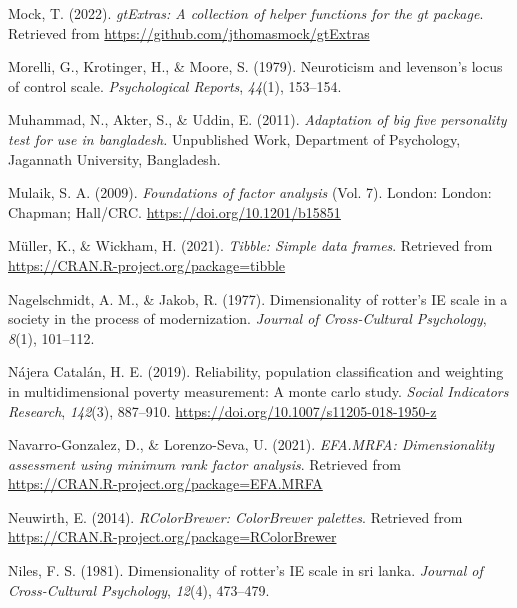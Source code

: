 \documentclass[
  english,
  man]{apa6}
\newlength{\cslhangindent}
\newlength{\cslentryspacingunit} %
\newenvironment{CSLReferences}[2] %
 {%
  \setlength{\parindent}{0pt}
  \ifodd #1
  \let\oldpar\par
  \def\par{\hangindent=\cslhangindent\oldpar}
  \fi
  \setlength{\parskip}{#2\cslentryspacingunit}
 }%
 {}
\begin{document}
\begin{CSLReferences}{1}{0}
\leavevmode{}%
Mock, T. (2022). \emph{gtExtras: A collection of helper functions for the gt package}. Retrieved from \url{https://github.com/jthomasmock/gtExtras}

\leavevmode{}%
Morelli, G., Krotinger, H., \& Moore, S. (1979). Neuroticism and levenson's locus of control scale. \emph{Psychological Reports}, \emph{44}(1), 153--154.

\leavevmode{}%
Muhammad, N., Akter, S., \& Uddin, E. (2011). \emph{Adaptation of big five personality test for use in bangladesh.} Unpublished Work, Department of Psychology, Jagannath University, Bangladesh.

\leavevmode{}%
Mulaik, S. A. (2009). \emph{Foundations of factor analysis} (Vol. 7). London: London: Chapman; Hall/CRC. \url{https://doi.org/10.1201/b15851}

\leavevmode{}%
Müller, K., \& Wickham, H. (2021). \emph{Tibble: Simple data frames}. Retrieved from \url{https://CRAN.R-project.org/package=tibble}

\leavevmode{}%
Nagelschmidt, A. M., \& Jakob, R. (1977). Dimensionality of rotter's IE scale in a society in the process of modernization. \emph{Journal of Cross-Cultural Psychology}, \emph{8}(1), 101--112.

\leavevmode{}%
Nájera Catalán, H. E. (2019). Reliability, population classification and weighting in multidimensional poverty measurement: A monte carlo study. \emph{Social Indicators Research}, \emph{142}(3), 887--910. \url{https://doi.org/10.1007/s11205-018-1950-z}

\leavevmode{}%
Navarro-Gonzalez, D., \& Lorenzo-Seva, U. (2021). \emph{EFA.MRFA: Dimensionality assessment using minimum rank factor analysis}. Retrieved from \url{https://CRAN.R-project.org/package=EFA.MRFA}

\leavevmode{}%
Neuwirth, E. (2014). \emph{RColorBrewer: ColorBrewer palettes}. Retrieved from \url{https://CRAN.R-project.org/package=RColorBrewer}

\leavevmode{}%
Niles, F. S. (1981). Dimensionality of rotter's IE scale in sri lanka. \emph{Journal of Cross-Cultural Psychology}, \emph{12}(4), 473--479.


\end{CSLReferences}
\end{document}
